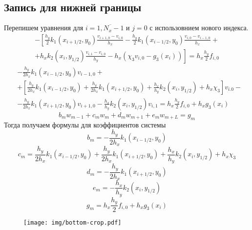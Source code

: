 \subsection{Запись для нижней границы}
Перепишем уравнения для $i = \overline{1,N_x-1}$ и $j = 0$ с использовнием нового индекса.
\begin{multline*}
    - \left[
    \frac{h_y}{2} k_1(x_{i+1/2},y_0) \frac{v_{i+1,0} - v_{i,0}}{h_x} - \frac{h_y}{2} k_1(x_{i-1/2},y_0) \frac{v_{i,0} - v_{i-1,0}}{h_x} + \right. \\
    \left. +
    h_x k_2(x_i,y_{1/2}) \frac{v_{i,1} - v_{i,0}}{h_y} - h_x \left( \chi_3 v_{i,0} - g_3(x_i) \right)
    \right] =
    h_x \frac{h_y}{2} f_{i,0}
\end{multline*}
\[
\begin{split}
    &-\frac{h_y}{2 h_x} k_1(x_{i-1/2},y_0) v_{i-1,0} +\\
    &+\left[ \frac{h_y}{2 h_x} k_1(x_{i-1/2},y_0) + \frac{h_y}{2 h_x} k_1(x_{i+1/2},y_0) + \frac{h_x}{h_y} k_2(x_i,y_{1/2}) + h_x \chi_3 \right] v_{i.0} - \\
    &- \frac{h_y}{2 h_x} k_1(x_{i+1/2},y_0) v_{i+1,0} - \frac{h_x}{h_y} k_2(x_i,y_{1/2}) v_{i,1} = h_x \frac{h_y}{2} f_{i,0} + h_x g_3(x_i)
\end{split}
\]
\[ b_m w_{m - 1} + c_m w_m + d_m w_{m + 1} + e_m w_{m + L} = g_m \]
Тогда получаем формулы для коэффициентов системы
\[ b_m = -\frac{h_y}{2 h_x} k_1(x_{i-1/2},y_0) \]
\[ c_m = \frac{h_y}{2 h_x} k_1(x_{i-1/2},y_0) + \frac{h_y}{2 h_x} k_1(x_{i+1/2},y_0) + \frac{h_x}{h_y} k_2(x_i,y_{1/2}) + h_x \chi_3 \]
\[ d_m = -\frac{h_y}{2 h_x} k_1(x_{i+1/2},y_0) \]
\[ e_m = -\frac{h_x}{h_y} k_2(x_i,y_{1/2}) \]
\[ g_m = h_x \frac{h_y}{2} f_{i,0} + h_x g_3(x_i) \]
\begin{figure}[H]
    \centering
    \texttt{[image: img/bottom-crop.pdf]}
\end{figure}

